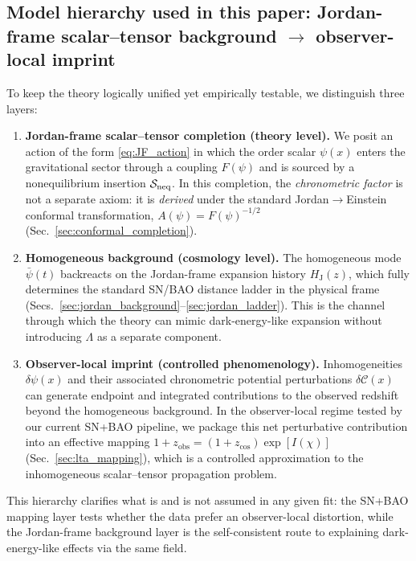\documentclass[10pt]{article}
\newcommand{\zobs}{z_{\mathrm{obs}}}
\newcommand{\zcos}{z_{\mathrm{cos}}}
\newcommand{\HJ}{H_{\mathrm{J}}}
\newcommand{\Fpsi}{F(\psi)}
\newcommand{\Apsi}{A(\psi)}
\begin{document}
\subsection{Model hierarchy used in this paper: Jordan-frame scalar--tensor background $\rightarrow$ observer-local imprint}
\label{sec:model_hierarchy}

To keep the theory logically unified yet empirically testable, we distinguish three layers:

\begin{enumerate}[leftmargin=1.2em]
\item \textbf{Jordan-frame scalar--tensor completion (theory level).}
We posit an action of the form \eqref{eq:JF_action} in which the order scalar \(\psi(x)\) enters the
gravitational sector through a coupling \(F(\psi)\) and is sourced by a nonequilibrium insertion
\(\mathcal{S}_{\rm neq}\). In this completion, the \emph{chronometric factor} is not a separate axiom:
it is \emph{derived} under the standard Jordan\(\rightarrow\)Einstein conformal transformation,
\(\Apsi=\Fpsi^{-1/2}\) (Sec.~\ref{sec:conformal_completion}).

\item \textbf{Homogeneous background (cosmology level).}
The homogeneous mode \(\bar\psi(t)\) backreacts on the Jordan-frame expansion history \(\HJ(z)\),
which fully determines the standard SN/BAO distance ladder in the physical frame
(Secs.~\ref{sec:jordan_background}--\ref{sec:jordan_ladder}). This is the channel through which the
theory can mimic dark-energy-like expansion without introducing \(\Lambda\) as a separate component.

\item \textbf{Observer-local imprint (controlled phenomenology).}
Inhomogeneities \(\delta\psi(x)\) and their associated chronometric potential perturbations
\(\delta\mathcal{C}(x)\) can generate endpoint and integrated contributions to the observed redshift beyond the
homogeneous background. In the observer-local regime tested by our current SN+BAO pipeline, we package
this net perturbative contribution into an effective mapping
\(1+\zobs=(1+\zcos)\exp[I(\chi)]\) (Sec.~\ref{sec:lta_mapping}), which is a controlled approximation to
the inhomogeneous scalar--tensor propagation problem.
\end{enumerate}

This hierarchy clarifies what is and is not assumed in any given fit: the SN+BAO mapping layer tests
whether the data prefer an observer-local distortion, while the Jordan-frame background layer is the
self-consistent route to explaining dark-energy-like effects via the same field.
\end{document}
